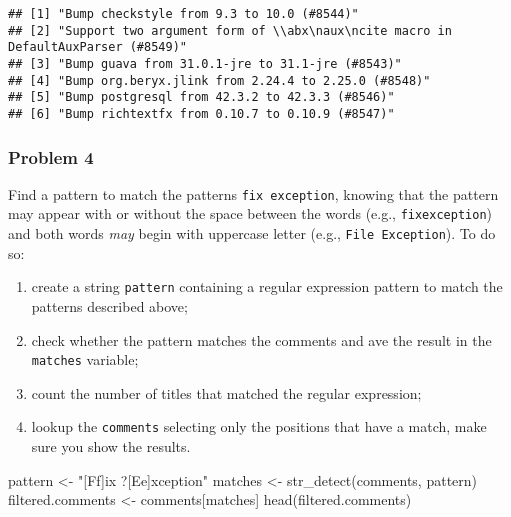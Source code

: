 \documentclass[
]{article}
\newenvironment{Shaded}{\begin{snugshade}}{\end{snugshade}}
\newcommand{\FunctionTok}[1]{\textcolor[rgb]{0.00,0.00,0.00}{#1}}
\newcommand{\NormalTok}[1]{#1}
\newcommand{\OtherTok}[1]{\textcolor[rgb]{0.56,0.35,0.01}{#1}}
\newcommand{\StringTok}[1]{\textcolor[rgb]{0.31,0.60,0.02}{#1}}
\providecommand{\tightlist}{%
  \setlength{\itemsep}{0pt}\setlength{\parskip}{0pt}}
\begin{document}
\begin{verbatim}
## [1] "Bump checkstyle from 9.3 to 10.0 (#8544)"                                       
## [2] "Support two argument form of \\abx\naux\ncite macro in DefaultAuxParser (#8549)"
## [3] "Bump guava from 31.0.1-jre to 31.1-jre (#8543)"                                 
## [4] "Bump org.beryx.jlink from 2.24.4 to 2.25.0 (#8548)"                             
## [5] "Bump postgresql from 42.3.2 to 42.3.3 (#8546)"                                  
## [6] "Bump richtextfx from 0.10.7 to 0.10.9 (#8547)"
\end{verbatim}

\hypertarget{problem-4}{%
\subsubsection{Problem 4}\label{problem-4}}

Find a pattern to match the patterns \texttt{fix\ exception}, knowing
that the pattern may appear with or without the space between the words
(e.g., \texttt{fixexception}) and both words \emph{may} begin with
uppercase letter (e.g., \texttt{File\ Exception}). To do so:

\begin{enumerate}
\def\labelenumi{\arabic{enumi}.}
\tightlist
\item
  create a string \texttt{pattern} containing a regular expression
  pattern to match the patterns described above;
\item
  check whether the pattern matches the comments and ave the result in
  the \texttt{matches} variable;
\item
  count the number of titles that matched the regular expression;
\item
  lookup the \texttt{comments} selecting only the positions that have a
  match, make sure you show the results.
\end{enumerate}

\begin{Shaded}
\begin{Highlighting}[]
\NormalTok{pattern }\OtherTok{\textless{}{-}} \StringTok{"[Ff]ix ?[Ee]xception"}
\NormalTok{matches }\OtherTok{\textless{}{-}} \FunctionTok{str\_detect}\NormalTok{(comments, pattern)}
\NormalTok{filtered.comments }\OtherTok{\textless{}{-}}\NormalTok{ comments[matches]}
\FunctionTok{head}\NormalTok{(filtered.comments)}
\end{Highlighting}
\end{Shaded}
\end{document}
